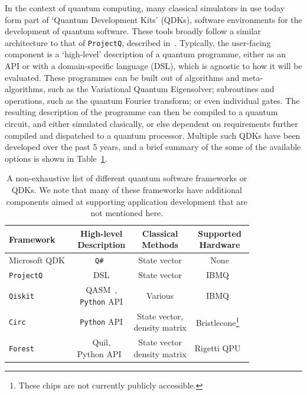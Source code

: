 In the context of quantum computing, many classical simulators in use today form part of `Quantum Development Kits' (QDKs), software environments for the development of quantum software. These tools broadly follow a similar architecture to that of \texttt{ProjectQ}, described in~\cite{Haner2018}. Typically, the user-facing component is a `high-level' description of a quantum programme, either as an API or with a domain-specific language (DSL), which is agnostic to how it will be evaluated. These programmes can be built out of algorithms and meta-algorithms, such as the Variational Quantum Eigensolver; subroutines and operations, such as the quantum Fourier transform; or even individual gates. The resulting description of the programme can then be compiled to a quantum circuit, and either simulated clasically, or else dependent on requirements further compiled and dispatched to a quantum processor. Multiple such QDKs have been developed over the past 5 years, and a brief summary of the some of the available options is shown in Table~\ref{tab:qdks}.
\begin{table}[H]
\begin{tabular}{|l|c|c|c|}
\toprule
Framework & \makecell{High-level\\Description} & \makecell{Classical\\ Methods} & \makecell{Supported\\ Hardware} \\ \midrule
Microsoft QDK~\cite{MicrosoftQDK} & \texttt{Q\#}~\cite{Svore2018} & State vector & None \\\midrule
\texttt{ProjectQ}~\cite{Steiger2016} & DSL & State vector & IBMQ~\cite{IBMQ} \\\midrule
\texttt{Qiskit}~\cite{Qiskit} & \makecell{QASM~\cite{Cross2017},\\ \texttt{Python} API} & Various & IBMQ~\cite{IBMQ}\\\midrule
\texttt{Circ}~\cite{GoogleCirc} & \texttt{Python} API & \makecell{State vector,\\density matrix} & Bristlecone\footnote{These chips are not currently publicly accessible.}~\cite{CircAnnouncement}\\\midrule
\texttt{Forest}~\cite{RigettiForest} & \makecell{Quil,\\ Python API~\cite{Smith2016}} & \makecell{State vector \\ density matrix} & Rigetti QPU~\cite{RigettiQPU}\\ \bottomrule
\end{tabular}
\caption{A non-exhaustive list of different quantum software frameworks or QDKs. We note that many of these frameworks have additional components aimed at supporting application development that are not mentioned here.}\label{tab:qdks}
\end{table}
